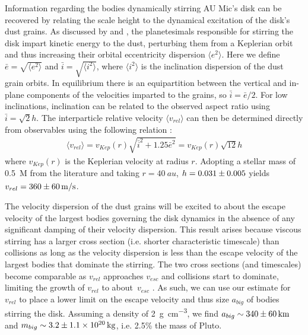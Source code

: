 \documentclass[modern]{aastex62}
\begin{document}
Information regarding the bodies dynamically stirring AU Mic's disk can be recovered by relating the scale height to the dynamical excitation of the disk's dust grains.
As discussed by \cite{thebault09} and \cite{quillen07}, the planetesimals responsible for stirring the disk impart kinetic energy to the dust, perturbing them from a Keplerian orbit and thus increasing their orbital eccentricity dispersion $\langle e^2 \rangle$. 
Here we define $\bar{e} = \sqrt{\langle e^2 \rangle}$ and $\bar{i} = \sqrt{\langle i^2 \rangle}$, where $\langle i^2 \rangle$ is the inclination dispersion of the dust grain orbits.
In equilibrium there is an equipartition between the vertical and in-plane components of the velocities imparted to the grains, so $\bar{i} = {\bar{e}}/{2}$.
For low inclinations, inclination can be related to the observed aspect ratio using $\bar{i} = \sqrt{2}h$.
The interparticle relative velocity $\langle v_{rel} \rangle$ can then be determined directly from observables using the following relation \citep{wetherill&stewart93,wyatt&dent02}:
\begin{gather}
  \langle v_{rel} \rangle = v_{Kep}(r) \sqrt{\bar{i}^2 + 1.25 \bar{e}^2} = v_{Kep}(r) \sqrt{12} h
\end{gather}
where $v_{Kep}(r)$ is the Keplerian velocity at radius $r$. 
Adopting a stellar mass of \SI{0.5}{M_\sun} from the literature \citep{plavchan09,houdebine&doyle94} and taking $r = \SI{40}{au}$, $h=\num{0.031 \pm 0.005}$ yields $v_{rel} = \SI{360 \pm 60}{m/s}$.

The velocity dispersion of the dust grains will be excited to about the escape velocity of the largest bodies governing the disk dynamics in the absence of any significant damping of their velocity dispersion. 
This result arises because viscous stirring has a larger cross section (i.e. shorter characteristic timescale) than collisions as long as the velocity dispersion is less than the escape velocity of the largest bodies that dominate the stirring. 
The two cross sections (and timescales) become comparable as $v_{rel}$ approaches $v_{esc}$ and collisions start to dominate, limiting the growth of $v_{rel}$ to about $v_{esc}$ \citep[e.g.]{schlichting14}.
As such, we can use our estimate for $v_{rel}$ to place a lower limit on the escape velocity and thus size $a_{big}$ of bodies stirring the disk.
Assuming a density of \SI{2}{\g.\cm^{-3}}, we find $a_{big} \sim \SI{340 \pm 60}{km}$ and $m_{big} \sim \SI{3.2 \pm 1.1e20}{kg}$, i.e. 2.5\% the mass of Pluto.
\end{document}
